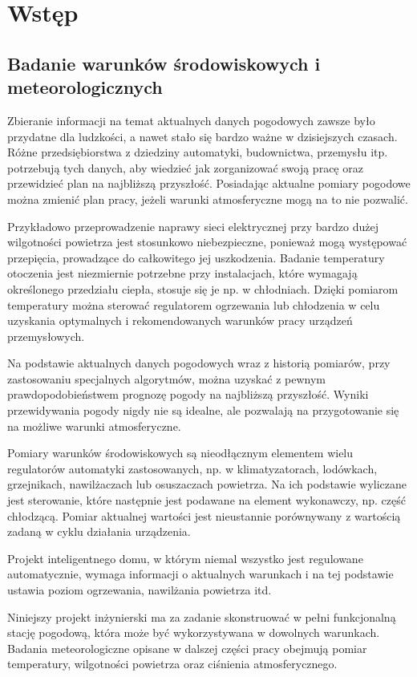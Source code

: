 \chapter{Wstęp}
\section*{Badanie warunków środowiskowych i meteorologicznych}
Zbieranie informacji na temat aktualnych danych pogodowych zawsze było przydatne dla ludzkości, a nawet stało się bardzo ważne w dzisiejszych czasach. Różne przedsiębiorstwa z dziedziny automatyki, budownictwa, przemysłu itp. potrzebują tych danych, aby wiedzieć jak zorganizować swoją pracę oraz przewidzieć plan na najbliższą przyszłość. Posiadając aktualne pomiary pogodowe można zmienić plan pracy, jeżeli warunki atmosferyczne mogą na to nie pozwalić.

Przykładowo przeprowadzenie naprawy sieci elektrycznej przy bardzo dużej wilgotności powietrza jest stosunkowo niebezpieczne, ponieważ mogą występować przepięcia, prowadzące do całkowitego jej uszkodzenia. Badanie temperatury otoczenia jest niezmiernie potrzebne przy instalacjach, które wymagają określonego przedziału ciepła, stosuje się je np. w chłodniach. Dzięki pomiarom temperatury można sterować regulatorem ogrzewania lub chłodzenia w celu uzyskania optymalnych i rekomendowanych warunków pracy urządzeń przemysłowych.

Na podstawie aktualnych danych pogodowych wraz z historią pomiarów, przy zastosowaniu specjalnych algorytmów, można uzyskać z pewnym prawdopodobieństwem prognozę pogody na najbliższą przyszłość. Wyniki przewidywania pogody nigdy nie są idealne, ale pozwalają na przygotowanie się na możliwe warunki atmosferyczne.

Pomiary warunków środowiskowych są nieodłącznym elementem wielu regulatorów automatyki zastosowanych, np. w klimatyzatorach, lodówkach, grzejnikach, nawilżaczach lub osuszaczach powietrza. Na ich podstawie wyliczane jest sterowanie, które następnie jest podawane na element wykonawczy, np. część chłodzącą. Pomiar aktualnej wartości jest nieustannie porównywany z wartością zadaną w cyklu działania urządzenia.

Projekt inteligentnego domu, w którym niemal wszystko jest regulowane automatycznie, wymaga informacji o aktualnych warunkach i na tej podstawie ustawia poziom ogrzewania, nawilżania powietrza itd.

Niniejszy projekt inżynierski ma za zadanie skonstruować w pełni funkcjonalną stację pogodową, która może być wykorzystywana w dowolnych warunkach. Badania meteorologiczne opisane w dalszej części pracy obejmują pomiar temperatury, wilgotności powietrza oraz ciśnienia atmosferycznego.


